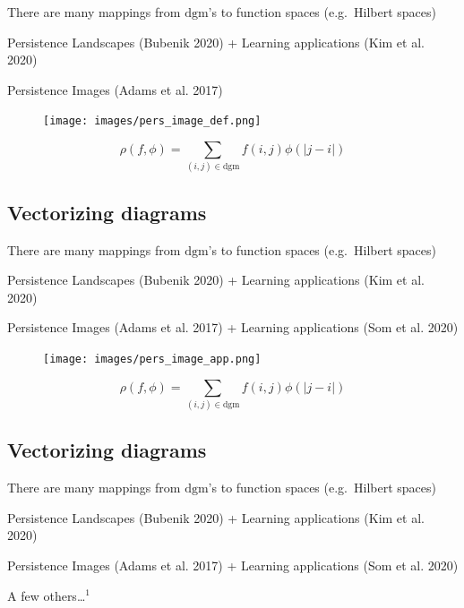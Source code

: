 \documentclass[
  letterpaper,
  DIV=11,
  numbers=noendperiod,
  oneside]{scrartcl}
\begin{document}
There are many mappings from \(\mathrm{dgm}\)'s to function spaces
(e.g.~Hilbert spaces)

Persistence Landscapes (Bubenik 2020) + Learning applications (Kim et
al. 2020)

Persistence Images (Adams et al. 2017)

\begin{figure}

{\centering \texttt{[image: images/pers\_image\_def.png]}

}

\end{figure}

\[ \rho(f, \phi) = \sum\limits_{(i,j) \in \mathrm{dgm}} f(i,j) \phi(\lvert j - i \rvert)\]

\subsection{Vectorizing diagrams}\label{vectorizing-diagrams-3}

There are many mappings from \(\mathrm{dgm}\)'s to function spaces
(e.g.~Hilbert spaces)

Persistence Landscapes (Bubenik 2020) + Learning applications (Kim et
al. 2020)

Persistence Images (Adams et al. 2017) + Learning applications (Som et
al. 2020)

\begin{figure}

{\centering \texttt{[image: images/pers\_image\_app.png]}

}

\end{figure}

\[ \rho(f, \phi) = \sum\limits_{(i,j) \in \mathrm{dgm}} f(i,j) \phi(\lvert j - i \rvert)\]

\subsection{Vectorizing diagrams}\label{vectorizing-diagrams-4}

There are many mappings from \(\mathrm{dgm}\)'s to function spaces
(e.g.~Hilbert spaces)

Persistence Landscapes (Bubenik 2020) + Learning applications (Kim et
al. 2020)

Persistence Images (Adams et al. 2017) + Learning applications (Som et
al. 2020)

A few others\ldots{}\(^1\)
\end{document}

